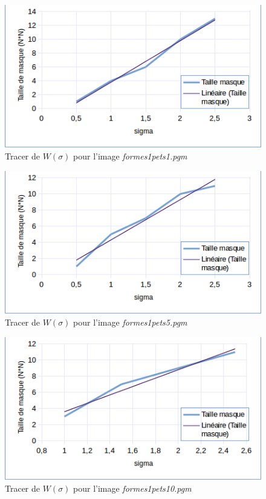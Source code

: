\documentclass[paper=a4, fontsize=11pt]{scrartcl} %
\begin{document}
\begin{figure}[h!]
\centering
\caption{Tracer de $W(\sigma)$ pour l'image \textit{formes1pets1.pgm}}
\label{w(sig)pets1}
\includegraphics[scale=0.8]{images/rapport/courbes/img1W.png} 
\end{figure}

\begin{figure}[h!]
\centering
\caption{Tracer de $W(\sigma)$ pour l'image \textit{formes1pets5.pgm}}
\label{w(sig)pets5}
\includegraphics[scale=0.8]{images/rapport/courbes/img5W.png} 
\end{figure}

\begin{figure}[h!]
\centering
\caption{Tracer de $W(\sigma)$ pour l'image \textit{formes1pets10.pgm}}
\label{w(sig)pets10}
\includegraphics[scale=0.8]{images/rapport/courbes/img10W.png} 
\end{figure}
\end{document}
